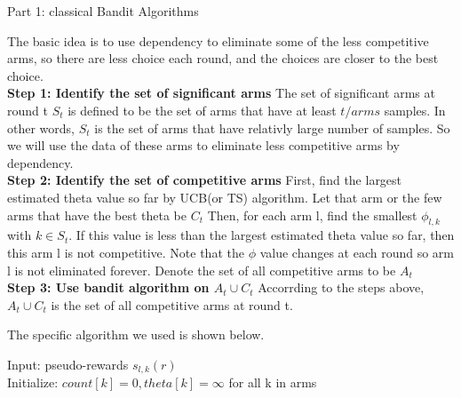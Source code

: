 \documentclass{article}
\begin{document}
\begin{homeworkProblem}{Part 1: classical Bandit Algorithms}
\begin{enumerate}
\begin{enumerate}
            The basic idea is to use dependency to eliminate some of the less competitive arms, so there are less choice each round, and the choices are closer to the best choice.\\
            \textbf{Step 1: Identify the set of significant arms} The set of significant arms at round t $S_t$ is defined to be the set of arms that have at least $t/arms$ samples.
            In other words, $S_t$ is the set of arms that have relativly large number of samples. So we will use the data of these arms to eliminate less competitive arms by dependency.\\
            \textbf{Step 2: Identify the set of competitive arms} First, find the largest estimated theta value so far by UCB(or TS) algorithm. Let that arm or the few arms that have the best theta be $C_t$ Then, for each arm l, find the smallest $\phi_{l,k}$ with $k\in S_t$.
            If this value is less than the largest estimated theta value so far, then this arm l is not competitive. Note that the $\phi$ value changes at each round so arm l is not eliminated forever.
            Denote the set of all competitive arms to be $A_t$\\
            \textbf{Step 3: Use bandit algorithm on $A_t\cup C_t$} Accorrding to the steps above, $A_t\cup C_t$ is the set of all competitive arms at round t.
        \end{enumerate}
        The specific algorithm we used is shown below.\\
        \begin{algorithm}[H]
            \SetAlgoLined
            Input: pseudo-rewards $s_{l,k}(r)$\\
            Initialize: $count[k] = 0, theta[k] = \infty$ for all k in arms\\
\end{algorithm}
\end{enumerate}
\end{homeworkProblem}
\end{document}
